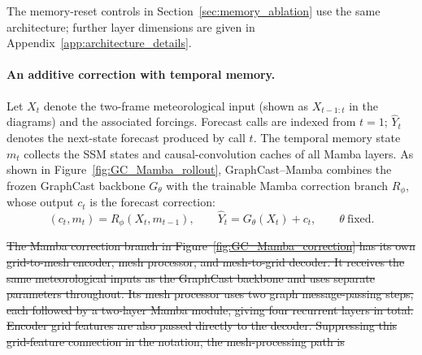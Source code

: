 \documentclass{article}
\newcommand{\vfourchange}[1]{{\color{blue}#1}}
\newcommand{\vfourred}[1]{{\color{red}#1}}
\newif\ifvfivechanges
\newcommand{\vfiveidentity}[1]{#1}
\DeclareRobustCommand{\vfiveadded}[1]{\ifvfivechanges{\color{vfiveAdded}%
  \let\vfourchange\vfiveidentity\let\vfourred\vfiveidentity#1}\else{\color{blue}%
  \let\vfourchange\vfiveidentity\let\vfourred\vfiveidentity#1}\fi}
\begin{document}
\ifvfivechanges
\par\begingroup\color{vfiveDeleted}\noindent
\sout{Our model uses an SSM state dimension of $16$ per inner channel, a causal convolution width of $4$, a rank-$32$ projection for the step-size parameter $\Delta_t$, and one shared group of input-dependent $B_t,C_t$ coefficients. Additional studies examine $d_{\mathrm{inner}}=32$. The memory-reset controls in Section~\mbox{\ref{sec:memory_ablation}} use $d_{\mathrm{inner}}=16$ and one shared $B,C$ group to test the contribution of temporal memory.}
\par\endgroup
\fi
\vfiveadded{The memory-reset controls in Section~\ref{sec:memory_ablation} use the same architecture; further layer dimensions are given in Appendix~\ref{app:architecture_details}.}


\paragraph{An additive correction with temporal memory.}
Let $X_t$ denote the two-frame meteorological input (shown as $X_{t-1:t}$ in the diagrams) and the associated forcings. Forecast calls are indexed from $t=1$; $\hat{Y}_t$ denotes the next-state forecast produced by call $t$. The temporal memory state $m_t$ collects the SSM states and causal-convolution caches of all Mamba layers. As shown in Figure~\ref{fig:GC_Mamba_rollout}, {GraphCast--Mamba combines the frozen GraphCast backbone $G_\theta$ with the trainable Mamba correction branch $R_\phi$, whose output $c_t$ is the forecast correction}:
\vspace{-4pt}
\begin{equation}
    (c_t,m_t)=R_\phi(X_t,m_{t-1}),
    \qquad
    \hat{Y}_t=G_\theta(X_t)+c_t,
    \qquad \theta\ \text{fixed}.
    \label{eq:additive_correction}
\end{equation}
\ifvfivechanges
\par\begingroup\color{vfiveDeleted}\noindent
\sout{The Mamba correction branch in Figure~\mbox{\ref{fig:GC_Mamba_correction}} has its own grid-to-mesh encoder, mesh processor, and mesh-to-grid decoder. It receives the same meteorological inputs as the GraphCast backbone and uses separate parameters throughout. Its mesh processor uses two graph message-passing steps, each followed by a two-layer Mamba module, giving four recurrent layers in total. Encoder grid features are also passed directly to the decoder. Suppressing this grid-feature connection in the notation, the mesh-processing path is}
\par\endgroup
\end{document}
